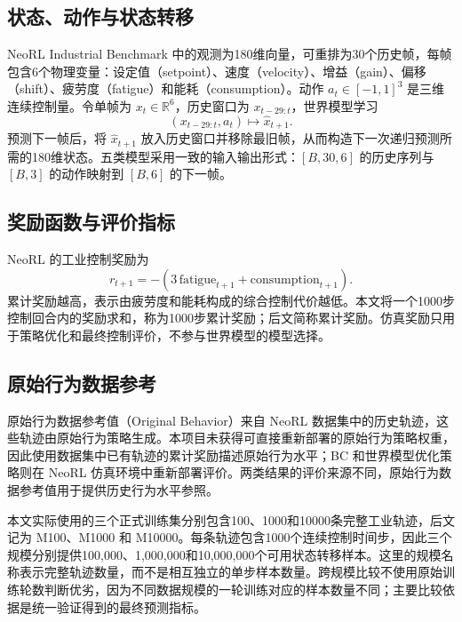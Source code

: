 \subsection{状态、动作与状态转移}

NeoRL Industrial Benchmark 中的观测为180维向量，可重排为30个历史帧，每帧包含6个物理变量：设定值（setpoint）、速度（velocity）、增益（gain）、偏移（shift）、疲劳度（fatigue）和能耗（consumption）。动作 $a_t\in[-1,1]^3$ 是三维连续控制量。令单帧为 $x_t\in\mathbb{R}^{6}$，历史窗口为 $x_{t-29:t}$，世界模型学习
\begin{equation}
  \left(x_{t-29:t},a_t\right)\longmapsto \hat{x}_{t+1}.
\end{equation}
预测下一帧后，将 $\hat{x}_{t+1}$ 放入历史窗口并移除最旧帧，从而构造下一次递归预测所需的180维状态。五类模型采用一致的输入输出形式：$[B,30,6]$ 的历史序列与 $[B,3]$ 的动作映射到 $[B,6]$ 的下一帧。

\subsection{奖励函数与评价指标}

NeoRL 的工业控制奖励为
\begin{equation}
  r_{t+1}=-\left(3\,\mathrm{fatigue}_{t+1}+\mathrm{consumption}_{t+1}\right).
\end{equation}
累计奖励越高，表示由疲劳度和能耗构成的综合控制代价越低。本文将一个1000步控制回合内的奖励求和，称为1000步累计奖励；后文简称累计奖励。仿真奖励只用于策略优化和最终控制评价，不参与世界模型的模型选择。

\subsection{原始行为数据参考}

原始行为数据参考值（Original Behavior）来自 NeoRL 数据集中的历史轨迹，这些轨迹由原始行为策略生成。本项目未获得可直接重新部署的原始行为策略权重，因此使用数据集中已有轨迹的累计奖励描述原始行为水平；BC 和世界模型优化策略则在 NeoRL 仿真环境中重新部署评价。两类结果的评价来源不同，原始行为数据参考值用于提供历史行为水平参照\cite{qin2022neorl}。

本文实际使用的三个正式训练集分别包含100、1000和10000条完整工业轨迹，后文记为 M100、M1000 和 M10000。每条轨迹包含1000个连续控制时间步，因此三个规模分别提供100,000、1,000,000和10,000,000个可用状态转移样本。这里的规模名称表示完整轨迹数量，而不是相互独立的单步样本数量。跨规模比较不使用原始训练轮数判断优劣，因为不同数据规模的一轮训练对应的样本数量不同；主要比较依据是统一验证得到的最终预测指标。
